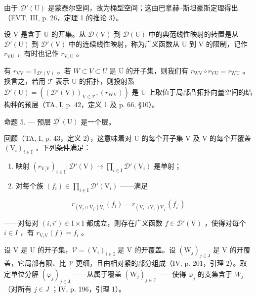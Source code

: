 由于 \(\mathcal{D}'(\mathrm{U})\) 是蒙泰尔空间，故为桶型空间；这由巴拿赫–斯坦豪斯定理得出（EVT, III, p. 26，定理 1 的推论 3）。

设 V 是含于 U 的开集。从 \(\mathcal{D}(\mathrm{V})\) 到 \(\mathcal{D}(\mathrm{U})\) 中的典范线性映射的转置是从 \(\mathcal{D}'(\mathrm{U})\) 到 \(\mathcal{D}'(\mathrm{V})\) 中的连续线性映射，称为广义函数从 U 到 V 的限制，记作 \(r_{\mathrm{VU}}\) ，有时也记作 \(r_{\mathrm{V,U}}\) 。

有 \(r_{\mathrm{VV}} = 1_{\mathcal{D}'(\mathrm{V})}\) 。若 \(W \subset V \subset U\) 是 U 的开子集，则我们有 \(r_{\mathrm{WV}} \circ r_{\mathrm{VU}} = r_{\mathrm{WU}}\) 。换言之，若用 \(\mathcal{T}\) 表示 U 的拓扑，则投射系 \(\underline{\mathcal{D}'}(\mathrm{U}) = ((\mathcal{D}'(\mathrm{V}))_{\mathrm{V} \in \mathcal{T}}, (r_{\mathrm{WV}}))\) 是 U 上取值于局部凸拓扑向量空间的结构种的预层（TA, I, p. 42，定义 1 及 p. 66, §10）。

命题 5. --- 预层 \(\underline{\mathcal{D}}^{\prime}(\mathrm{U})\) 是一个层。

回顾（TA, I, p. 43，定义 2），这意味着对 U 的每个开子集 V 及 V 的每个开覆盖 \((\mathrm{V}_{i})_{i\in\mathrm{I}}\) ，下列条件满足：

\begin{enumerate}
\def\labelenumi{(\roman{enumi})}
\item
  映射 \((r_{\mathrm{V}_i\mathrm{V}})_{i\in \mathrm{I}}\colon \mathcal{D}'(\mathrm{V})\to \prod_{i\in \mathrm{I}}\mathcal{D}'(\mathrm{V}_i)\) 是单射；
\item
  对每个族 \((f_i)\in \prod_{i\in \mathrm{I}}\mathcal{D}'(\mathrm{V}_i)\) ——满足
\end{enumerate}

\[
r _ {(\mathrm{V} _ {i} \cap \mathrm{V} _ {i ^ {\prime}}) \mathrm{V} _ {i}} (f _ {i}) = r _ {(\mathrm{V} _ {i} \cap \mathrm{V} _ {i ^ {\prime}}) \mathrm{V} _ {i ^ {\prime}}} (f _ {i ^ {\prime}})
\]

——对每对 \((i, i') \in \mathrm{I} \times \mathrm{I}\) 都成立，则存在广义函数 \(f \in \mathcal{D}'(\mathrm{V})\) ，使得对每个 \(i \in I\) ，有 \(r_{\mathrm{V}_{i}\mathrm{V}}(f) = f_{i}\) 。

设 V 是 U 的开子集，\(\mathcal{V} = (\mathrm{V}_{i})_{i \in \mathrm{I}}\) 是 V 的开覆盖。设 \((\mathrm{W}_{j})_{j \in \mathrm{J}}\) 是 V 的开覆盖，它局部有限、比 \(\mathcal{V}\) 更细，且由相对紧的部分组成（IV, p. 201，引理 2）。取定单位分解 \((\varphi_{j})_{j \in \mathrm{J}}\) ——从属于覆盖 \((\mathrm{W}_{j})_{j \in \mathrm{J}}\) ——使得 \(\varphi_{j}\) 的支集含于 \(W_{j}\) （对所有 \(j \in J\) ；IV, p. 196，引理 1）。

